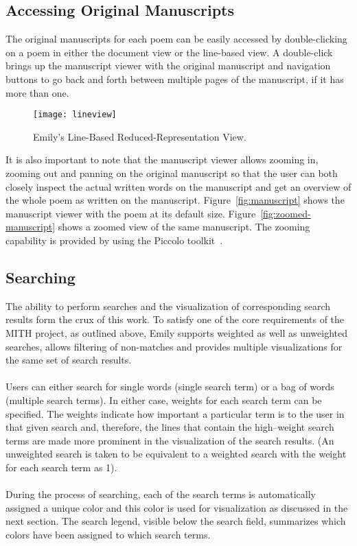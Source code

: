 \documentclass[10pt, twocolumn]{article}
\begin{document}
\subsection{Accessing Original Manuscripts}\label{sec:manu}
The original manuscripts for each poem can be easily accessed by double-clicking on a poem in either the document view or the line-based view. A double-click brings up the manuscript viewer with the original manuscript and navigation buttons to go back and forth between multiple pages of the manuscript, if it has more than one. \\
\begin{figure*}
\begin{center}
\texttt{[image: lineview]} 
\end{center}
\caption{Emily's Line-Based Reduced-Representation View.} \label{fig:lineview}
\end{figure*}

It is also important to note that the manuscript viewer allows zooming in, zooming out and panning on the original manuscript so that the user can both closely inspect the actual written words on the manuscript and get an overview of the whole poem as written on the manuscript. Figure~\ref{fig:manuscript} shows the manuscript viewer with the poem at its default size. Figure~\ref{fig:zoomed-manuscript} shows a zoomed view of the same manuscript. The zooming capability is provided by using the Piccolo toolkit~\cite{piccolo}. 
\subsection{Searching}\label{sec:search}
The ability to perform searches and the visualization of corresponding search results form the crux of this work. To satisfy one of the core requirements of the MITH project, as outlined above, Emily supports weighted as well as unweighted searches, allows filtering of non-matches and provides multiple visualizations for the same set of search results. \\ \\
Users can either search for single words (single search term) or a bag of words (multiple search terms). In either case, weights for each search term can be specified. The weights indicate how important a particular term is to the user in that given search and, therefore, the lines that contain the high--weight search terms are made more prominent in the visualization of the search results. (An unweighted search is taken to be equivalent to a weighted search with the weight for each search term as 1).\\ \\
 During the process of searching, each of the search terms is automatically assigned a unique color and this color is used for visualization as discussed in the next section. The search legend, visible below the search field, summarizes which colors have been assigned to which search terms. 
\end{document}
